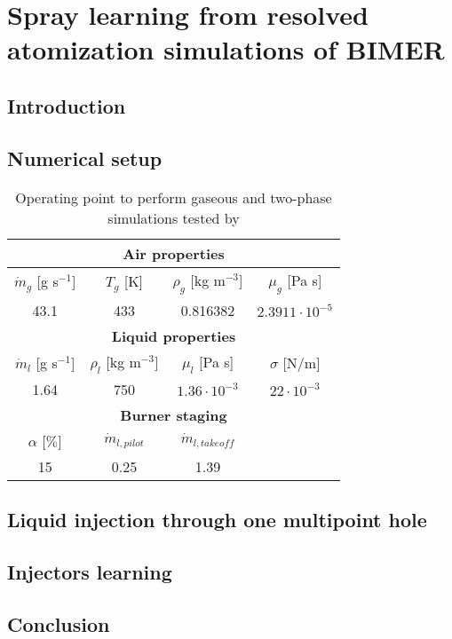 \chapter{Spray learning from resolved atomization simulations of BIMER}
	\label{ch:bimer_test_bench}

\section{Introduction}

\section{Numerical setup}

\begin{table}[!h]
\centering
\caption{Operating point to perform gaseous and two-phase simulations tested by }
\begin{tabular}{|c|c|c|c|}
\hline
\multicolumn{4}{|c|}{\textbf{Air properties}} \\
\hline
$\dot{m}_g$ [g s$^{-1}$] & $T_g$ [K] & $\rho_g$ [kg m$^{-3}$]  & $\mu_g$ [Pa s]  \\
\hline
43.1 & 433 & 0.816382 & $2.3911 \cdot 10^{-5}$ \\
\hline
\hline
\multicolumn{4}{|c|}{\textbf{Liquid properties}} \\
\hline
$\dot{m}_l$ [g s$^{-1}$] & $\rho_l$ [kg m$^{-3}]$   & $\mu_l$ [Pa s]   & $\sigma$ [N/m]   \\
\hline
1.64 & 750 & $1.36 \cdot 10^{-3}$ & $22 \cdot 10^{-3}$ \\
\hline
\hline
\multicolumn{4}{|c|}{\textbf{Burner staging}} \\
\hline
$\alpha$ [$\%$] & $\dot{m}_{l,pilot}$ & $\dot{m}_{l,takeoff}$ & \\
\hline
15 & 0.25 & 1.39 & \\
\hline
\end{tabular}
\label{tab:liquid_operating_point_Renaud}
\end{table}


\section{Liquid injection through one multipoint hole}

\section{Injectors learning}

\section{Conclusion}
